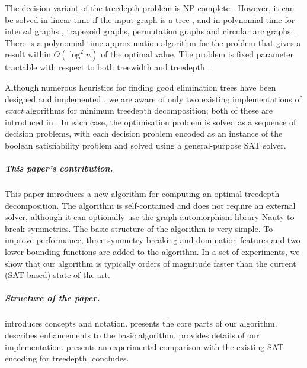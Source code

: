 {    The decision variant of the treedepth problem is NP-complete \cite{pothen1988complexity}.  However, it can
    be solved in linear time if the input graph is a tree
    \cite{DBLP:journals/ipl/Schaffer89}, and in polynomial time for interval graphs
    \cite{Aspvall1994}, trapezoid graphs, permutation graphs and circular arc
    graphs \cite{DBLP:journals/dam/DeogunKKM99}.  There is a polynomial-time approximation algorithm
    for the problem that gives a result within $O(\log^2 n)$ of the optimal value.
    The problem is fixed parameter
    tractable with respect to both treewidth and treedepth \cite{DBLP:journals/siamdm/BodlaenderDJKKMT98,DBLP:conf/icalp/ReidlRVS14}.

    Although numerous heuristics for finding good elimination trees have been designed
    and implemented \cite{groer2012inddgo},
    we are aware of only two existing implementations of \emph{exact} algorithms for minimum treedepth
    decomposition; both of these are introduced in \cite{DBLP:conf/alenex/GanianLOS19,DBLP:journals/corr/abs-1911-12995}.  In
    each case, the optimisation problem is solved as a sequence of decision problems,
    with each decision problem encoded as an instance of the boolean satisfiability problem
    and solved using a general-purpose SAT solver.

    \subparagraph*{This paper's contribution.} This paper introduces a new algorithm for computing an optimal treedepth
    decomposition.  The algorithm is self-contained and does not require an external solver,
    although it can optionally use the graph-automorphism library Nauty to break symmetries.
    The basic structure of the
    algorithm is very simple.  To improve performance, three symmetry breaking and domination features
    and two lower-bounding functions are added to the algorithm.  In a set of experiments, we show that our
    algorithm is typically orders of magnitude faster than the current (SAT-based) state of the art.

    \subparagraph*{Structure of the paper.}  introduces concepts and notation.
     presents the core parts of our algorithm.  
    describes enhancements to the basic algorithm.   provides details of our implementation.
     presents an experimental comparison with the existing SAT encoding for treedepth.
     concludes.

}
